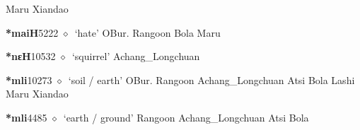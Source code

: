 \begin{list}{}{\leftmargin=1.5em \itemindent=-1.5em}
         Maru 
\hspace{1ex}
         Xiandao 
  \item {\footnotesize \textbf{*maiH}}{\tiny 5222}
\hspace{1ex}
         $\diamond$~`hate'
         OBur. 
\hspace{1ex}
         Rangoon 
\hspace{1ex}
         Bola 
\hspace{1ex}
         Maru 
  \item {\footnotesize \textbf{*nɛH}}{\tiny 10532}
\hspace{1ex}
         $\diamond$~`squirrel'
         Achang\_Longchuan 
  \item {\footnotesize \textbf{*mli}}{\tiny 10273}
\hspace{1ex}
         $\diamond$~`soil / earth'
         OBur. 
\hspace{1ex}
         Rangoon 
\hspace{1ex}
         Achang\_Longchuan 
\hspace{1ex}
         Atsi 
\hspace{1ex}
         Bola 
\hspace{1ex}
         Lashi 
\hspace{1ex}
         Maru 
\hspace{1ex}
         Xiandao 
  \item {\footnotesize \textbf{*mli}}{\tiny 4485}
\hspace{1ex}
         $\diamond$~`earth / ground'
         Rangoon 
\hspace{1ex}
         Achang\_Longchuan 
\hspace{1ex}
         Atsi 
\hspace{1ex}
         Bola 

\end{list}
